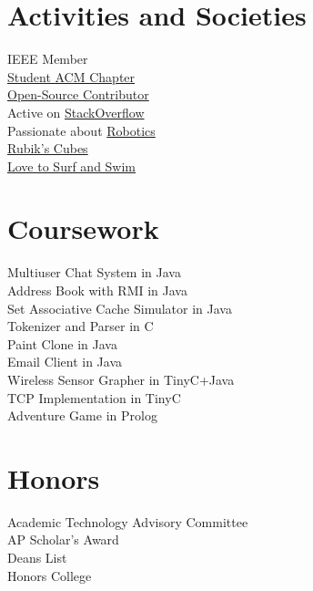 \documentclass[10pt]{article}
\begin{document}
\begin{minipage}[t]{0.44\textwidth}
\section{Activities and Societies}
   IEEE Member\\
   \href{http://polaris.cs.wcu.edu/~acm/}{Student ACM Chapter}\\
   \href{https://github.com/ranman}{Open-Source Contributor}\\
   Active on \href{http://stackoverflow.com/users/240004/ranman}{StackOverflow}\\
   Passionate about \href{http://robotics.punahou.edu/}{Robotics}\\
   \href{http://www.youtube.com/user/ranman96734}{Rubik's Cubes}\\
   \href{http://www.punahouaquatics.org/Home.jsp?team=hipaq}{Love to Surf and Swim}\\
\section{Coursework}
   Multiuser Chat System in Java\\
   Address Book with RMI in Java\\
   Set Associative Cache Simulator in Java\\
   Tokenizer and Parser in C\\
   Paint Clone in Java\\
   Email Client in Java\\
   Wireless Sensor Grapher in TinyC+Java\\
   TCP Implementation in TinyC\\
   Adventure Game in Prolog\\
\section{Honors}
   Academic Technology Advisory Committee\\
   AP Scholar's Award\\
   Deans List\\
   Honors College\\
\end{minipage}
\end{document}
